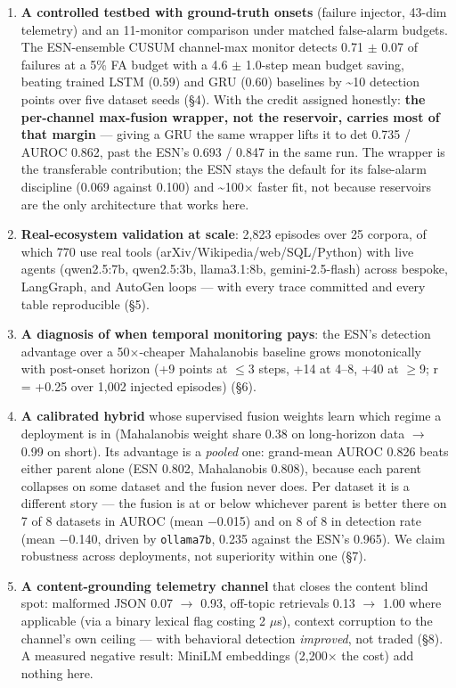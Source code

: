 \documentclass[11pt]{article}
\begin{document}
\begin{enumerate}
\item \textbf{A controlled testbed with ground-truth onsets} (failure injector, 43-dim telemetry) and an 11-monitor comparison under matched false-alarm budgets. The ESN-ensemble CUSUM channel-max monitor detects 0.71 $\pm$ 0.07 of failures at a 5\% FA budget with a 4.6 $\pm$ 1.0-step mean budget saving, beating trained LSTM (0.59) and GRU (0.60) baselines by \textasciitilde{}10 detection points over five dataset seeds (\S{}4). With the credit assigned honestly: \textbf{the per-channel max-fusion wrapper, not the reservoir, carries most of that margin} --- giving a GRU the same wrapper lifts it to det 0.735 / AUROC 0.862, past the ESN's 0.693 / 0.847 in the same run. The wrapper is the transferable contribution; the ESN stays the default for its false-alarm discipline (0.069 against 0.100) and \textasciitilde{}100$\times$ faster fit, not because reservoirs are the only architecture that works here.
\item \textbf{Real-ecosystem validation at scale}: 2,823 episodes over 25 corpora, of which 770 use real tools (arXiv/Wikipedia/web/SQL/Python) with live agents (qwen2.5:7b, qwen2.5:3b, llama3.1:8b, gemini-2.5-flash) across bespoke, LangGraph, and AutoGen loops --- with every trace committed and every table reproducible (\S{}5).
\item \textbf{A diagnosis of when temporal monitoring pays}: the ESN's detection advantage over a 50$\times$-cheaper Mahalanobis baseline grows monotonically with post-onset horizon (+9 points at $\leq$3 steps, +14 at 4--8, +40 at $\geq$9; r = +0.25 over 1,002 injected episodes) (\S{}6).
\item \textbf{A calibrated hybrid} whose supervised fusion weights learn which regime a deployment is in (Mahalanobis weight share 0.38 on long-horizon data $\rightarrow$ 0.99 on short). Its advantage is a \emph{pooled} one: grand-mean AUROC 0.826 beats either parent alone (ESN 0.802, Mahalanobis 0.808), because each parent collapses on some dataset and the fusion never does. Per dataset it is a different story --- the fusion is at or below whichever parent is better there on 7 of 8 datasets in AUROC (mean $-$0.015) and on 8 of 8 in detection rate (mean $-$0.140, driven by \texttt{ollama7b}, 0.235 against the ESN's 0.965). We claim robustness across deployments, not superiority within one (\S{}7).
\item \textbf{A content-grounding telemetry channel} that closes the content blind spot: malformed JSON 0.07 $\rightarrow$ 0.93, off-topic retrievals 0.13 $\rightarrow$ 1.00 where applicable (via a binary lexical flag costing 2 $\mu$s), context corruption to the channel's own ceiling --- with behavioral detection \emph{improved}, not traded (\S{}8). A measured negative result: MiniLM embeddings (2,200$\times$ the cost) add nothing here.

\end{enumerate}
\end{document}
